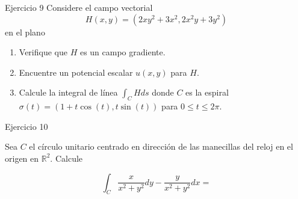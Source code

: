 \documentclass[usepdftitle=false]{beamer}
\begin{document}
\begin{frame}{Ejercicio 9}
Considere el campo vectorial \[H(x,y)=(2xy^2+3x^2, 2x^2y+3y^2)\]
en el plano

\begin{enumerate}
\item Verifique que $H$ es un campo gradiente.
\item Encuentre un potencial escalar $u(x,y)$ para $H$.
\item Calcule la integral de l\'inea $\int_C H ds$
donde $C$ es la espiral $\sigma(t)=(1+ t\cos(t), t\sin(t))$ para $0\leq t\leq 2\pi$. 
\end{enumerate}

\end{frame}

\begin{frame}{Ejercicio 10}

Sea $C$ el c\'irculo unitario centrado en direcci\'on de las manecillas del reloj en el origen en $\mathbb{R}^2$. Calcule 

\[\int_C \frac{x}{x^2+y^2}dy-\frac{y}{x^2+y^2}dx=\] 


\end{frame}
\end{document}
